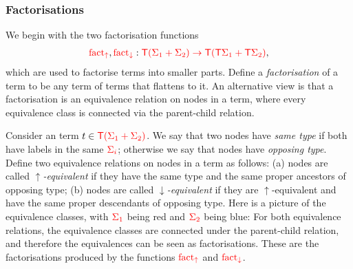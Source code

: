 \subsubsection{Factorisations}
\label{sec:factorisation-functions}
We begin with the two factorisation functions 
\begin{align*}
    {\color{red}{\mathrm{fact_{\uparrow}}}},{\color{red}{\mathrm{fact_{\downarrow}}}}  : {\color{red}{{\color{red}{\mathsf T}}(\Sigma_1+\Sigma_2) \to {\color{red}{\mathsf T}}({\color{red}{\mathsf T}}\Sigma_1 + {\color{red}{\mathsf T}}\Sigma_2)}},
\end{align*}
which are used to factorise  terms into smaller parts. 
Define a \emph{factorisation} of a term   to be any term of terms that flattens to it.  An alternative view is that a factorisation is an equivalence relation on nodes in a term, where every equivalence class is connected via the parent-child relation.

Consider an  term $t \in {\color{red}{{\color{red}{\mathsf T}}({\color{red}{\Sigma}}_1 + {\color{red}{\Sigma}}_2)}}$.
        We say that two nodes have \emph{same type} if both have labels in the same  ${\color{red}{\Sigma_i}}$; otherwise we say that nodes have \emph{opposing type}. Define  two equivalence relations on  nodes in a term as follows: (a) nodes are called  \emph{$\uparrow$-equivalent}  if they have the same type and the same proper ancestors of opposing type; (b) nodes are  called  \emph{$\downarrow$-equivalent}  if they  are $\uparrow$-equivalent and have the same proper descendants of opposing type.
           Here is a picture of the equivalence classes, with ${\color{red}{\Sigma_1}}$ being red and ${\color{red}{\Sigma_2}}$ being blue: 
        For both  equivalence relations, the equivalence classes are connected  under the parent-child relation, and therefore the equivalences can be seen as factorisations. These are the factorisations  produced by the functions ${\color{red}{\mathrm{fact_{\uparrow}}}}$ and ${\color{red}{\mathrm{fact_{\downarrow}}}}$. 
    
